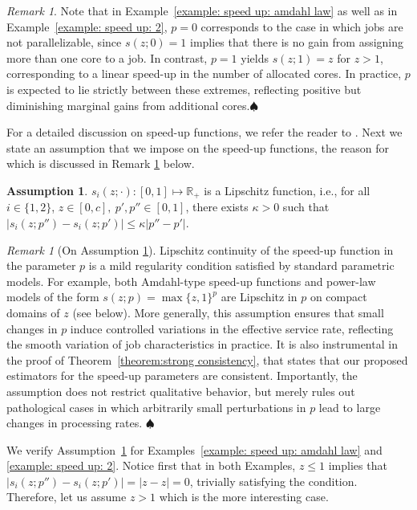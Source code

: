 \documentclass[11pt]{article}
\theoremstyle{remark}
\newtheorem{remark}[thm]{Remark}
\theoremstyle{definition}
\newtheorem{ass}[thm]{Assumption}
\numberwithin{equation}{section}
\begin{document}
\begin{remark}
Note that in Example~\ref{example: speed up: amdahl law} as well as in Example~\ref{example: speed up: 2}, $p=0$ corresponds to the case in which jobs are not parallelizable, since $s(z;0)=1$ implies that there is no gain from assigning more than one core to a job. In contrast, $p=1$ yields $s(z;1)=z$ for $z>1$, corresponding to a linear speed-up in the number of allocated cores. In practice, $p$ is expected to lie strictly between these extremes, reflecting positive but diminishing marginal gains from additional cores.\hfill $\spadesuit$
\end{remark}

For a detailed discussion on speed-up functions, we refer the reader to \cite{berg2017}. Next we state an assumption that we impose on the speed-up functions, the reason for which is discussed in Remark \ref{remark:lipschitz} below.

\begin{ass}\label{ass:Lipschitz speed up}
    $s_i(z;\cdot): [0,1] \mapsto \mathbb{R}_+$ is a Lipschitz function, i.e., for all $i \in \{1,2\}$, $z \in [0, c], \ p', p'' \in [0,1]$, there exists $\kappa > 0$ such that $\big\vert s_i(z;p'') - s_i(z;p') \big\vert \leq \kappa \big\vert p''-p' \big\vert$.
\end{ass}

\begin{remark}[On Assumption \ref{ass:Lipschitz speed up}]\label{remark:lipschitz}
Lipschitz continuity of the speed-up function in the parameter $p$ is a mild regularity condition satisfied by standard parametric models. For example, both Amdahl-type speed-up functions and power-law models of the form $s(z;p)=\max\{z,1\}^p$ are Lipschitz in $p$ on compact domains of $z$ (see below). More generally, this assumption ensures that small changes in $p$ induce controlled variations in the effective service rate, reflecting the smooth variation of job characteristics in practice. It is also instrumental in the proof of Theorem~\ref{theorem:strong consistency}, that states that our proposed estimators for the speed-up parameters are consistent. Importantly, the assumption does not restrict qualitative behavior, but merely rules out pathological cases in which arbitrarily small perturbations in $p$ lead to large changes in processing rates. \hfill $\spadesuit$
\end{remark}

We verify Assumption~\ref{ass:Lipschitz speed up} for Examples~\ref{example: speed up: amdahl law} and \ref{example: speed up: 2}. Notice first that in both Examples, $z \leq 1$ implies that $\big\vert s_i(z;p'') - s_i(z;p') \big\vert = |z - z| = 0$, trivially satisfying the condition. Therefore, let us assume $z > 1$ which is the more interesting case.
\end{document}
